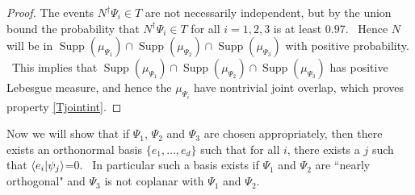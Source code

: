 \documentclass[letterpaper,12pt]{article}
\newcommand{\braket}[2]{\mbox{$ \langle #1 | #2 \rangle $}}
\DeclareMathOperator{\supp}{Supp}
\begin{document}
\begin{proof}
The events $N^\dagger \Psi_i \in T$ are not necessarily independent, but by the union bound the probability that $N^\dagger \Psi_i \in T$ for all $i=1,2,3$ is at least $0.97$. \ Hence $N$ will be in $\supp(\mu_{\Psi_1}) \cap \supp(\mu_{\Psi_2}) \cap \supp(\mu_{\Psi_3})$ with positive probability. \ This implies that $ \supp(\mu_{\Psi_1}) \cap \supp(\mu_{\Psi_2}) \cap \supp(\mu_{\Psi_3})$ has positive Lebesgue measure, and hence the $\mu_{\Psi_i}$ have nontrivial joint overlap, which proves property \ref{Tjointint}.

\end{proof}


Now we will show that if $\Psi_1$, $\Psi_2$ and $\Psi_3$ are chosen appropriately, then there exists an orthonormal basis $\{e_1,\ldots,e_d\}$ such that for all $i$, there exists a $j$ such that $\braket{e_i}{\psi_j}$=0. \ In particular such a basis exists if $\Psi_1$ and $\Psi_2$ are ``nearly orthogonal" and $\Psi_3$ is not coplanar with $\Psi_1$ and $\Psi_2$.
\end{document}

